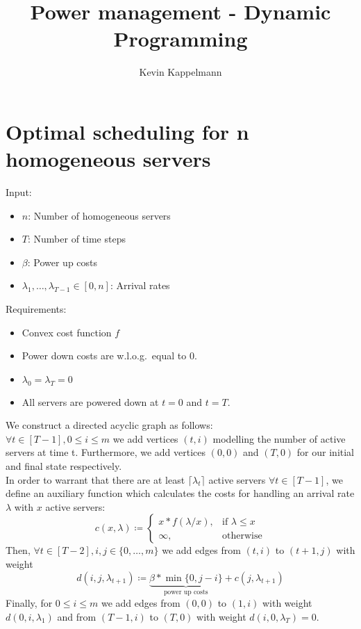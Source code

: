 \documentclass[hidelinks]{article}
\title{Power management - Dynamic Programming}
\author{Kevin Kappelmann\\
  \multicolumn{1}{p{.7\textwidth}}{\centering\emph{Chair for Theoretical Computer Science,\\
  Technical University of Munich}}}
\theoremstyle{plain}
\theoremstyle{definition}
\theoremstyle{rem}
\begin{document}

\begin{sloppypar}
\section{Optimal scheduling for n homogeneous servers}
Input:
\begin{itemize}
	\item $n$: Number of homogeneous servers
	\item $T$: Number of time steps
	\item $\beta$: Power up costs
	\item $\lambda_1,\ldots,\lambda_{T-1}\in[0,n]$: Arrival rates
\end{itemize}
Requirements:
\begin{itemize}
	\item Convex cost function $f$
	\item Power down costs are w.l.o.g.\ equal to 0.
	\item $\lambda_0=\lambda_T=0$
	\item All servers are powered down at $t=0$ and $t=T$.
\end{itemize}
We construct a directed acyclic graph as follows:\\
$\forall t\in[T-1],0\le i\le m$ we add vertices $(t,i)$ modelling the number of active servers at time t. Furthermore, we add vertices $(0,0)$ and $(T,0)$ for our initial and final state respectively.\\
In order to warrant that there are at least $\lceil\lambda_t\rceil$ active servers $\forall t\in[T-1]$, we define an auxiliary function which calculates the costs for handling an arrival rate $\lambda$ with $x$ active servers:
\begin{equation}
	c(x,\lambda)\coloneqq\begin{cases}
	  x*f(\lambda/x), & \text{if $\lambda\le x$}\\
	  \infty, & \text{otherwise}
	  \end{cases}
\end{equation}
Then, $\forall t\in[T-2],i,j\in\{0,\ldots,m\}$ we add edges from $(t,i)$ to $(t+1,j)$ with weight
\begin{equation}
	d(i,j,\lambda_{t+1})\coloneqq\underbrace{\beta*\min\{0,j-i\}}_{\text{power up costs}}+c(j,\lambda_{t+1})
\end{equation}
Finally, for $0\le i\le m$ we add edges from $(0,0)$ to $(1,i)$ with weight $d(0,i,\lambda_1)$ and from $(T-1,i)$ to $(T,0)$ with weight $d(i,0,\lambda_T)=0$.
\begin{figure}[H]
\centering
\begin{tikzpicture}[->,>=stealth',auto,node distance=3cm,thick,node/.style={minimum size=1.2cm,circle,draw}]


\end{tikzpicture}
\end{figure}
\end{sloppypar}
\end{document}
